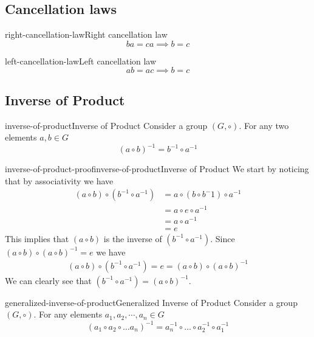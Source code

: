 \documentclass[preview]{standalone}
\begin{document}
\subsection{Cancellation laws}

\begin{snippettheorem}{right-cancellation-law}{Right cancellation law}
    \[
        ba = ca \implies b = c
    \]
\end{snippettheorem}

\begin{snippettheorem}{left-cancellation-law}{Left cancellation law}
    \[
        ab = ac \implies b = c
    \]
\end{snippettheorem}

\subsection{Inverse of Product}

\begin{snippettheorem}{inverse-of-product}{Inverse of Product}
    Consider a group \((G, \circ)\). For any two elements \(a,b \in G\)
    \[{(a \circ b)}^{-1} = b^{-1} \circ a^{-1}\]
\end{snippettheorem}

\begin{snippetproof}{inverse-of-product-proof}{inverse-of-product}{Inverse of Product}
    We start by noticing that by associativity we have
    \begin{align*}
        (a \circ b) \circ (b^{-1} \circ a^{-1}) &= a \circ (b \circ b^-1) \circ a^{-1} \\
        &= a \circ e \circ a^{-1} \\
        &= a \circ a^{-1} \\
        &= e
    \end{align*}
    This implies that \((a \circ b)\) is the inverse of \((b^{-1} \circ a^{-1})\).
    Since \((a\circ b) \circ {(a \circ b)}^{-1} =e\) we have
    \begin{align*}
        (a \circ b) \circ (b^{-1} \circ a^{-1}) = e = (a\circ b) \circ {(a \circ b)}^{-1}
    \end{align*}
    We can clearly see that \((b^{-1} \circ a^{-1}) = {(a \circ b)}^{-1}\).
\end{snippetproof}

\begin{snippettheorem}{generalized-inverse-of-product}{Generalized Inverse of Product}
    Consider a group \((G, \circ)\). For any elements \(a_1,a_2,\cdots,a_n \in G\)
    \[
        (a_1 \circ a_2 \circ \dots a_n)^{-1}
        = a_n^{-1} \circ \dots \circ a_2^{-1} \circ a_1^{-1}
    \]
\end{snippettheorem}
\end{document}
